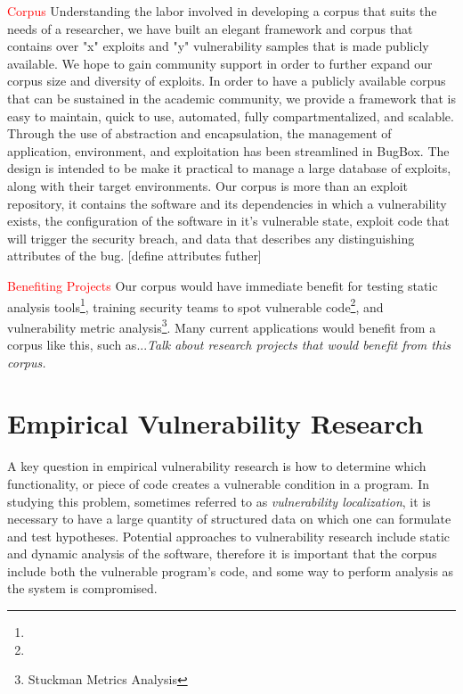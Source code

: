 \documentclass[letterpaper,twocolumn,10pt]{article}
\begin{document}
\textcolor{red}{Corpus}
Understanding the labor involved in developing a corpus that suits the needs of a researcher, we have built an elegant framework and corpus that contains over "x" exploits and "y" vulnerability samples that is made publicly available.  We hope to gain community support in order to further expand our corpus size and diversity of exploits.  In order to have a publicly available corpus that can be sustained in the academic community, we provide a framework that is easy to maintain, quick to use, automated, fully compartmentalized, and scalable.  Through the use of abstraction and encapsulation, the management of application, environment, and exploitation has been streamlined in BugBox.  The design is intended to be make it practical to manage a large database of exploits, along with their target environments. Our corpus is more than an exploit repository, it contains the software and its dependencies in which a vulnerability exists, the configuration of the software in it's vulnerable state, exploit code that will trigger the security breach, and data that describes any distinguishing attributes of the bug. [define attributes futher]\par

\textcolor{red}{Benefiting Projects}
Our corpus would have immediate benefit for testing static analysis tools\footnote{}, training security teams to spot vulnerable code\footnote{}, and vulnerability metric analysis\footnote{Stuckman Metrics Analysis}.
Many current applications would benefit from a corpus like this, such as...{\em Talk about research projects that would benefit from this corpus.}

\section{Empirical Vulnerability Research}

A key question in empirical vulnerability research is how to determine which functionality, or piece of code creates a vulnerable condition in a program. In studying this problem, sometimes referred to as \emph{vulnerability localization}, it is necessary to have a large quantity of structured data on which one can formulate and test hypotheses. Potential approaches to vulnerability research include static and dynamic analysis of the software, therefore it is important that the corpus include both the vulnerable program's code, and some way to perform analysis as the system is compromised.\\
\end{document}
